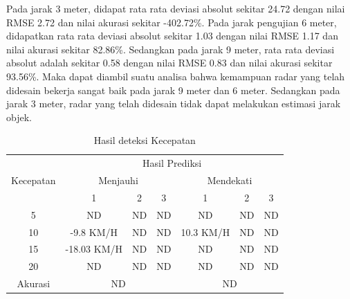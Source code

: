 Pada jarak 3 meter, didapat rata rata deviasi absolut sekitar 24.72 dengan nilai RMSE 2.72 dan nilai akurasi sekitar -402.72\%. Pada jarak pengujian 6 meter, didapatkan rata rata deviasi absolut sekitar 1.03 dengan nilai RMSE 1.17 dan nilai akurasi sekitar 82.86\%. Sedangkan pada jarak 9 meter, rata rata deviasi absolut adalah sekitar 0.58 dengan nilai RMSE 0.83 dan nilai akurasi sekitar 93.56\%. Maka dapat diambil suatu analisa bahwa kemampuan radar yang telah didesain bekerja sangat baik pada jarak 9 meter dan 6 meter. Sedangkan pada jarak 3 meter, radar yang telah didesain tidak dapat melakukan estimasi jarak objek.


\begin{table}[H]
    \caption{Hasil deteksi Kecepatan}
    \label{tab:estVelocity}
    \begin{tabular}{|c|cccccc|}
        \hline
        \multirow{3}{*}{Kecepatan} & \multicolumn{6}{c|}{Hasil Prediksi}                                                                                                                  \\ \cline{2-7} 
                                   & \multicolumn{3}{c|}{Menjauhi}                                                        & \multicolumn{3}{c|}{Mendekati}                                \\ \cline{2-7} 
                                   & \multicolumn{1}{c|}{1}           & \multicolumn{1}{c|}{2}  & \multicolumn{1}{c|}{3}  & \multicolumn{1}{c|}{1}         & \multicolumn{1}{c|}{2}  & 3  \\ \hline
        5                          & \multicolumn{1}{c|}{ND}          & \multicolumn{1}{c|}{ND} & \multicolumn{1}{c|}{ND} & \multicolumn{1}{c|}{ND}        & \multicolumn{1}{c|}{ND} & ND \\ \hline
        10                         & \multicolumn{1}{c|}{-9.8 KM/H}   & \multicolumn{1}{c|}{ND} & \multicolumn{1}{c|}{ND} & \multicolumn{1}{c|}{10.3 KM/H} & \multicolumn{1}{c|}{ND} & ND \\ \hline
        15                         & \multicolumn{1}{c|}{-18.03 KM/H} & \multicolumn{1}{c|}{ND} & \multicolumn{1}{c|}{ND} & \multicolumn{1}{c|}{ND}        & \multicolumn{1}{c|}{ND} & ND \\ \hline
        20                         & \multicolumn{1}{c|}{ND}          & \multicolumn{1}{c|}{ND} & \multicolumn{1}{c|}{ND} & \multicolumn{1}{c|}{ND}        & \multicolumn{1}{c|}{ND} & ND \\ \hline
        Akurasi                    & \multicolumn{3}{c|}{ND}                                                              & \multicolumn{3}{c|}{ND}                                       \\ \hline
        \end{tabular}
    \end{table}

